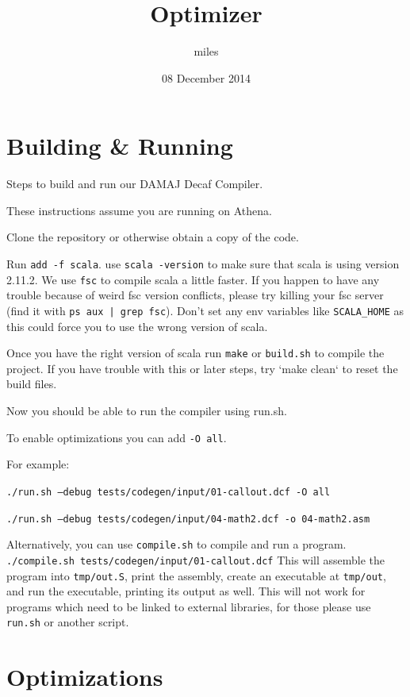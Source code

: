 \documentclass[11pt]{article}
\title{Optimizer}
\author{miles}
\date{08 December 2014}
\begin{document}
\maketitle

\setcounter{tocdepth}{3}
\tableofcontents
\vspace*{1cm}
\section{Building \& Running}
\label{sec-1}

  Steps to build and run our DAMAJ Decaf Compiler.
  
  These instructions assume you are running on Athena.
  
  Clone the repository or otherwise obtain a copy of the code.

  Run \texttt{add -f scala}. use \texttt{scala -version} to make sure that scala is using version 2.11.2.
  We use \texttt{fsc} to compile scala a little faster. If you happen to have any trouble because of weird
  fsc version conflicts, please try killing your fsc server (find it with \texttt{ps aux | grep fsc}).
  Don't set any env variables like \texttt{SCALA\_HOME} as this could force you to use the wrong version
  of scala.
  
  Once you have the right version of scala run \texttt{make} or \texttt{build.sh} to compile the project.
  If you have trouble with this or later steps, try `make clean` to reset the build files.
  
  Now you should be able to run the compiler using run.sh.

  To enable optimizations you can add \texttt{-O all}.

  For example:

  \texttt{./run.sh --debug tests/codegen/input/01-callout.dcf -O all}

  \texttt{./run.sh --debug tests/codegen/input/04-math2.dcf -o 04-math2.asm}

  Alternatively, you can use \texttt{compile.sh} to compile and run a program.
  \texttt{./compile.sh tests/codegen/input/01-callout.dcf}
  This will assemble the program into \texttt{tmp/out.S}, print the assembly, create an executable at \texttt{tmp/out},
  and run the executable, printing its output as well. This will not work for programs which need to be
  linked to external libraries, for those please use \texttt{run.sh} or another script.
  
\section{Optimizations}
\label{sec-2}
\end{document}
